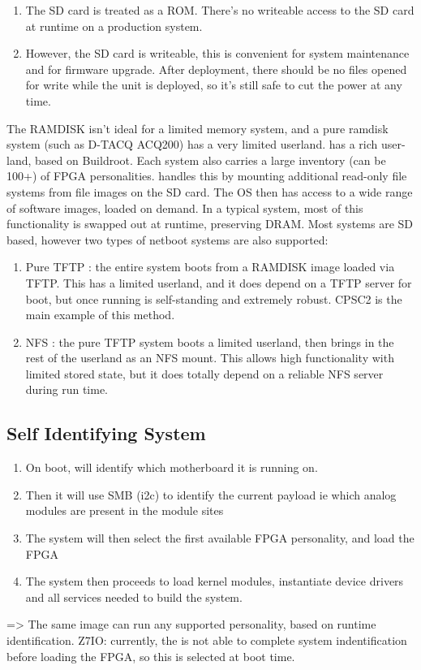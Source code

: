 \documentclass[]{article}
\begin{document}
\begin{enumerate}
    \item The SD card is treated as a ROM. There’s no writeable access to the SD card at runtime on a production system.
    \item However, the SD card is writeable, this is convenient for system maintenance and for firmware upgrade.  After deployment, there should be no files opened for write while the unit is deployed, so it’s still safe to cut the power at any time.
\end{enumerate} 
The RAMDISK isn’t ideal for a limited memory system, and a pure ramdisk system (such as D-TACQ ACQ200) has a very limited userland.  has a rich user-land, based on Buildroot. Each  system also carries a large inventory (can be 100+) of FPGA personalities.  handles this by mounting additional read-only file systems from file images on the SD card. The OS then has access to a wide range of software images, loaded on demand. In a typical system, most of this functionality is swapped out at runtime, preserving DRAM.
Most systems are SD based, however two types of netboot systems are also supported:
\begin{enumerate}
    \item Pure TFTP : the entire system boots from a RAMDISK image loaded via TFTP. This has a limited userland, and it does depend on a TFTP server for boot, but once running is self-standing and extremely robust. CPSC2 is the main example of this method.
    \item NFS : the pure TFTP system boots a limited userland, then brings in the rest of the userland as an NFS mount. This allows high functionality with limited stored state, but it does totally depend on a reliable NFS server during run time.
\end{enumerate} 

\subsection{Self Identifying System}
\begin{enumerate}
    \item On boot,  will identify which motherboard it is running on.
    \item Then it will use SMB (i2c) to identify the current payload 
        	ie which analog modules are present in the module sites
    \item The system will then select the first available FPGA personality, and load the FPGA
    \item The system then proceeds to load kernel modules, instantiate device drivers and all services needed to build the system.
\end{enumerate}
=> The same  image can run any supported personality, based on runtime identification.
Z7IO: currently, the  is not able to complete system indentification before loading the FPGA, so this is selected at boot time.
\end{document}
